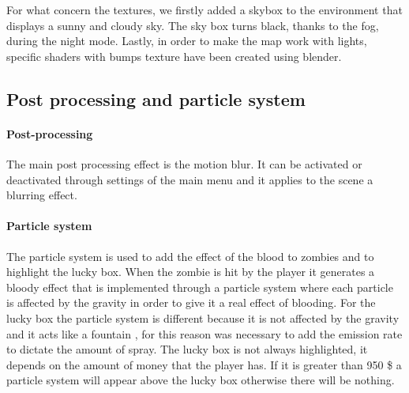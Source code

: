 \documentclass[12pt,a4paper,oneside]{article}
\theoremstyle{definition}
\begin{document}
For what concern the textures, we firstly added a skybox to the environment that displays a sunny and cloudy sky. The sky box turns black, thanks to the fog, during the night mode. Lastly, in order to make the map work with lights, specific shaders with bumps texture have been created using blender.

\subsection{Post processing and particle system}

\paragraph{Post-processing} The main post processing effect is the motion blur. It can be activated or deactivated through settings of the main menu and it applies to the scene a blurring effect. 
\paragraph{Particle system}
The particle system is used to add the effect of the blood to zombies and to highlight the lucky box. When the zombie is hit by the player it generates a bloody effect that is implemented through a particle system where each particle is affected by the gravity in order to give it a real effect of blooding. For the lucky box the particle system is different because it is not affected by the gravity and it acts like a fountain , for this reason was necessary to add the emission rate  to dictate the amount of spray. The lucky box is not always  highlighted, it depends on the amount of money that the player has. If it is greater than 950 \$ a particle system will appear above the lucky box otherwise there will be nothing.  
\end{document}
